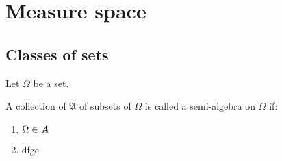 \section{Measure space}

\subsection{Classes of sets}

Let \textbf{\textit{$\Omega$}} be a set.
\begin{definition}
A collection of $\mathfrak{A}$ of subsets of $\Omega$ is called a semi-algebra on $\Omega$ if:\\

\begin{enumerate}
    \item $\Omega \in \textbf{\textit{A}}$
    \item dfge
\end{enumerate}
    
\end{definition}